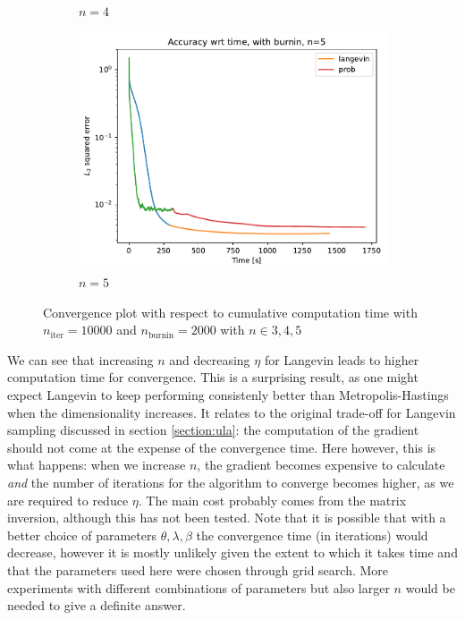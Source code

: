 \documentclass[12pt]{memoir}
\newcommand{\nitern}[1]{$n_{\text{iter}}=#1$}
\newcommand{\nburninn}[1]{$n_{\text{burnin}}=#1$}
\begin{document}
\begin{figure}[H]
\begin{subfigure}[b]{0.49\textwidth}
        \caption{$n=4$}
        \label{fig:conv-plot-time-diff-n-4-sub}
    \end{subfigure}
    \begin{subfigure}[b]{0.49\textwidth}
        \centering
        \includegraphics[width=\textwidth]{figures/experiments/baseline/diff_n_qubits/iters_acc_comp_time_no_avg_n5-1.png}
        \caption{$n=5$}
        \label{fig:conv-plot-time-diff-n-5-sub}
    \end{subfigure}
    \caption{Convergence plot with respect to cumulative computation time with \nitern{10000} and \nburninn{2000} with $n\in{3,4,5}$}
    \label{fig:conv-plot-time-diff-n}
\end{figure}

We can see that increasing $n$ and decreasing $\eta$ for Langevin leads to higher computation time for convergence. This is a surprising result, as one might expect Langevin to keep performing consistenly better than Metropolis-Hastings when the dimensionality increases. It relates to the original trade-off for Langevin sampling discussed in section \ref{section:ula}: the computation of the gradient should not come at the expense of the convergence time. Here however, this is what happens: when we increase $n$, the gradient becomes expensive to calculate \textit{and} the number of iterations for the algorithm to converge becomes higher, as we are required to reduce $\eta$. The main cost probably comes from the matrix inversion, although this has not been tested. Note that it is possible that with a better choice of parameters $\theta,\lambda,\beta$ the convergence time (in iterations) would decrease, however it is mostly unlikely given the extent to which it takes time and that the parameters used here were chosen through grid search. More experiments with different combinations of parameters but also larger $n$ would be needed to give a definite answer.\medbreak
\end{document}
